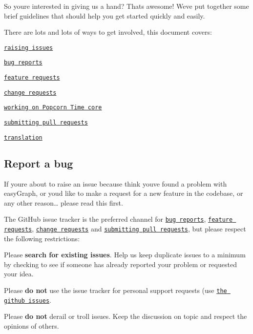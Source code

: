 So you\textquotesingle{}re interested in giving us a hand? That\textquotesingle{}s awesome! We\textquotesingle{}ve put together some brief guidelines that should help you get started quickly and easily.

There are lots and lots of ways to get involved, this document covers\+:


\begin{DoxyItemize}
\item \href{#report-a-bug}{\tt raising issues}
\begin{DoxyItemize}
\item \href{#bug-reports}{\tt bug reports}
\item \href{#feature-requests}{\tt feature requests}
\item \href{#change-requests}{\tt change requests}
\end{DoxyItemize}
\item \href{#working-on-popcorn-time-core}{\tt working on Popcorn Time core}
\begin{DoxyItemize}
\item \href{#submitting-pull-requests}{\tt submitting pull requests}
\end{DoxyItemize}
\item \href{#translation}{\tt translation}
\end{DoxyItemize}

\subsection*{Report a bug}

If you\textquotesingle{}re about to raise an issue because think you\textquotesingle{}ve found a problem with easy\+Graph, or you\textquotesingle{}d like to make a request for a new feature in the codebase, or any other reason… please read this first.

The Git\+Hub issue tracker is the preferred channel for \href{#bug-reports}{\tt bug reports}, \href{#feature-requests}{\tt feature requests}, \href{#change-requests}{\tt change requests} and \href{#submitting-pull-requests}{\tt submitting pull requests}, but please respect the following restrictions\+:


\begin{DoxyItemize}
\item Please {\bfseries search for existing issues}. Help us keep duplicate issues to a minimum by checking to see if someone has already reported your problem or requested your idea.
\item Please {\bfseries do not} use the issue tracker for personal support requests (use \href{https://github.com/JairFrancesco/easyGraph/issues}{\tt the github issues}.
\item Please {\bfseries do not} derail or troll issues. Keep the discussion on topic and respect the opinions of others.
\end{DoxyItemize}

